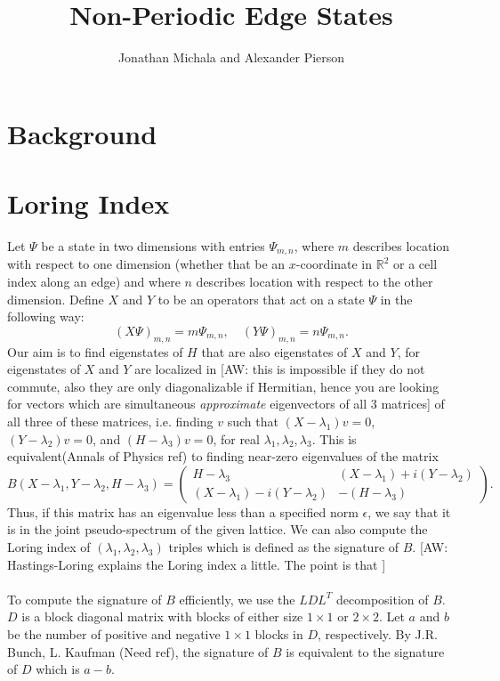 \documentclass[a4paper]{article}
\title{Non-Periodic Edge States}
\author{Jonathan Michala and Alexander Pierson}
\newcommand{\aw}[1]{{\color{blue} [AW: #1]}}
\begin{document}
\maketitle

\section{Background}
\section{Loring Index}
Let $\Psi$ be a state in two dimensions with entries $\Psi_{m,n}$, where $m$ describes location with respect to one dimension (whether that be an $x$-coordinate in $\mathbb{R}^2$ or a cell index along an edge) and where $n$ describes location with respect to the other dimension.
Define $X$ and $Y$ to be an operators that act on a state $\Psi$ in the following way:
$$(X \Psi)_{m,n} = m\Psi_{m,n}, \quad (Y \Psi)_{m,n} = n\Psi_{m,n}.$$
Our aim is to find eigenstates of $H$ that are also eigenstates of $X$ and $Y$, for eigenstates of $X$ and $Y$ are localized in  \aw{this is impossible if they do not commute, also they are only diagonalizable if Hermitian, hence you are looking for vectors which are simultaneous \emph{approximate} eigenvectors of all 3 matrices} of all three of these matrices, i.e. finding $v$ such that $(X - \lambda_1)v = 0$, $(Y - \lambda_2)v = 0$, and $(H-\lambda_3)v = 0$, for real $\lambda_1,\lambda_2,\lambda_3$. This is equivalent(Annals of Physics ref) to finding near-zero eigenvalues of the matrix
$$B(X - \lambda_1, Y - \lambda_2, H - \lambda_3) =
\begin{pmatrix}
H - \lambda_3 & (X - \lambda_1) + i(Y - \lambda_2)\\
(X - \lambda_1) - i(Y - \lambda_2) & - (H - \lambda_3)
\end{pmatrix}.$$
Thus, if this matrix has an eigenvalue less than a specified norm $\epsilon$, we say that it is in the joint pseudo-spectrum of the given lattice. We can also compute the Loring index of $(\lambda_1,\lambda_2,\lambda_3)$ triples which is defined as the signature of $B$. \aw{Hastings-Loring explains the Loring index a little. The point is that } \\\\
To compute the signature of $B$ efficiently, we use the $LDL^T$ decomposition of $B$. $D$ is a block diagonal matrix with blocks of either size $1 \times 1$ or $2 \times 2$. Let $a$ and $b$ be the number of positive and negative $1 \times 1$ blocks in $D$, respectively. By J.R. Bunch, L. Kaufman (Need ref), the signature of $B$ is equivalent to the signature of $D$ which is $a - b$.
\end{document}
